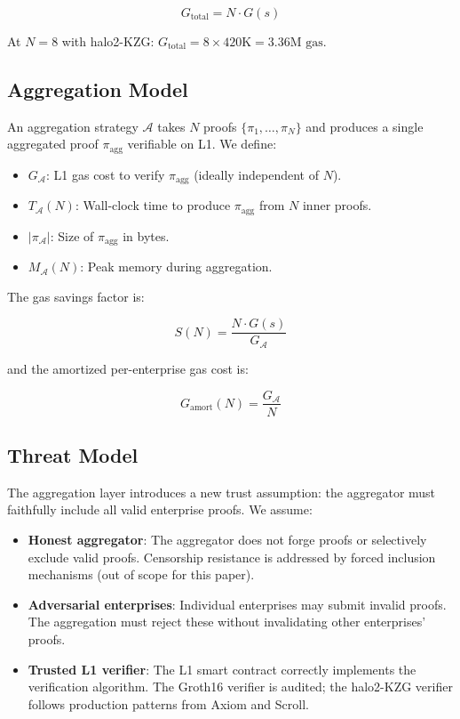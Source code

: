 \begin{equation}
  G_{\text{total}} = N \cdot G(s) \label{eq:total-gas}
\end{equation}

\noindent At $N{=}8$ with halo2-KZG: $G_{\text{total}} = 8 \times 420\text{K} = 3.36\text{M gas}$.

\subsection{Aggregation Model}

An aggregation strategy $\mathcal{A}$ takes $N$ proofs
$\{\pi_1, \ldots, \pi_N\}$ and produces a single aggregated proof
$\pi_{\text{agg}}$ verifiable on L1. We define:

\begin{itemize}
  \item $G_{\mathcal{A}}$: L1 gas cost to verify $\pi_{\text{agg}}$
    (ideally independent of $N$).
  \item $T_{\mathcal{A}}(N)$: Wall-clock time to produce
    $\pi_{\text{agg}}$ from $N$ inner proofs.
  \item $|\pi_{\mathcal{A}}|$: Size of $\pi_{\text{agg}}$ in bytes.
  \item $M_{\mathcal{A}}(N)$: Peak memory during aggregation.
\end{itemize}

The gas savings factor is:

\begin{equation}
  S(N) = \frac{N \cdot G(s)}{G_{\mathcal{A}}} \label{eq:savings}
\end{equation}

\noindent and the amortized per-enterprise gas cost is:

\begin{equation}
  G_{\text{amort}}(N) = \frac{G_{\mathcal{A}}}{N} \label{eq:amort}
\end{equation}

\subsection{Threat Model}

The aggregation layer introduces a new trust assumption: the aggregator
must faithfully include all valid enterprise proofs. We assume:

\begin{itemize}
  \item \textbf{Honest aggregator}: The aggregator does not forge proofs
    or selectively exclude valid proofs. Censorship resistance is
    addressed by forced inclusion mechanisms (out of scope for this
    paper).
  \item \textbf{Adversarial enterprises}: Individual enterprises may
    submit invalid proofs. The aggregation must reject these without
    invalidating other enterprises' proofs.
  \item \textbf{Trusted L1 verifier}: The L1 smart contract correctly
    implements the verification algorithm. The Groth16 verifier is
    audited; the halo2-KZG verifier follows production patterns from
    Axiom and Scroll.
\end{itemize}

